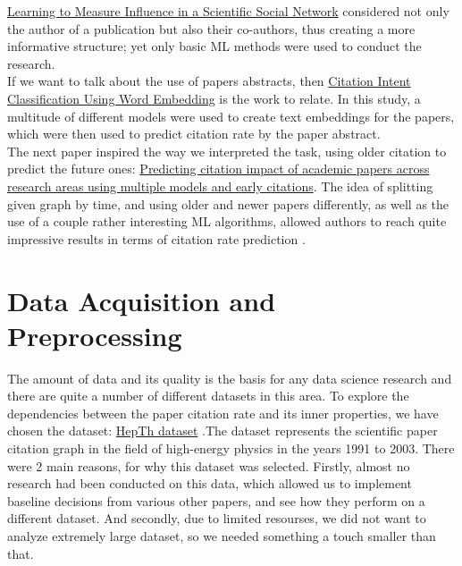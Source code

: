 \tab \href{https://link.springer.com/chapter/10.1007/978-3-319-06483-3_4?fromPaywallRec=true}{Learning to Measure Influence in a Scientific Social Network} considered not only the author of a publication but also their co-authors, thus creating a more informative structure; yet only basic ML methods were used to conduct the research.\\

\tab If we want to talk about the use of papers abstracts, then \href{https://www.researchgate.net/publication/348440299_Citation_Intent_Classification_Using_Word_Embedding}{Citation Intent Classification Using Word Embedding} is the work to relate. In this study, a multitude of different models were used to create text embeddings for the papers, which were then used to predict citation rate by the paper abstract.\\

\tab The next paper inspired the way we interpreted the task, using older citation to predict the future ones: \href{https://www.researchgate.net/publication/381695536_Predicting_citation_impact_of_academic_papers_across_research_areas_using_multiple_models_and_early_citations}{Predicting citation impact of academic papers across research areas using multiple models and early citations}. The idea of splitting given graph by time, and using older and newer papers differently, as well as the use of a couple rather interesting ML algorithms, allowed authors to reach quite impressive results in terms of citation rate prediction .\\
\section{Data Acquisition and Preprocessing}

\tab	The amount of data and its quality is the basis for any data science research and there are quite a number of different datasets in this area. To explore the dependencies between the paper citation rate and its inner properties, we have chosen the dataset: \href{https://www.kaggle.com/datasets/wolfram77/graphs-snap-cit}{HepTh dataset} .The dataset represents the scientific paper citation graph in the field of high-energy physics in the years 1991 to 2003. There were 2 main reasons, for why this dataset was selected. Firstly, almost no research had been conducted on this data, which allowed us to implement baseline decisions from various other papers, and see how they perform on a different dataset. And secondly, due to limited resourses, we did not want to analyze extremely large dataset, so we needed something a touch smaller than that. \\

